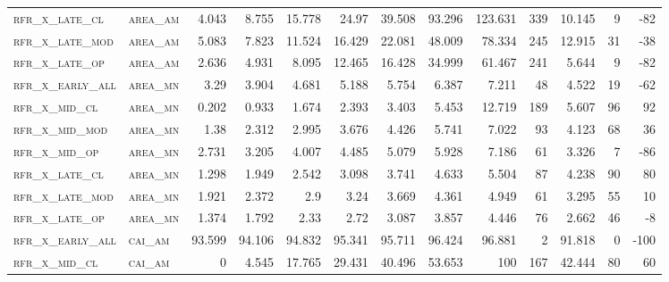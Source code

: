 \begin{landscape}
\begin{center}
\begin{footnotesize}
\begin{longtable}{llrrrrrrrr|rrr}
\textsc{rfr\_x\_late\_cl  } & \textsc{area\_am  }   & 4.043   & 8.755   & 15.778  & 24.97    & 39.508   & 93.296   & 123.631  & 339    & 10.145        & 9             & -82             \\
\textsc{rfr\_x\_late\_mod } & \textsc{area\_am  }   & 5.083   & 7.823   & 11.524  & 16.429   & 22.081   & 48.009   & 78.334   & 245    & 12.915        & 31            & -38             \\
\textsc{rfr\_x\_late\_op  } & \textsc{area\_am  }   & 2.636   & 4.931   & 8.095   & 12.465   & 16.428   & 34.999   & 61.467   & 241    & 5.644         & 9             & -82             \\
\textsc{rfr\_x\_early\_all} & \textsc{area\_mn  }   & 3.29    & 3.904   & 4.681   & 5.188    & 5.754    & 6.387    & 7.211    & 48     & 4.522         & 19            & -62             \\
\textsc{rfr\_x\_mid\_cl   } & \textsc{area\_mn  }   & 0.202   & 0.933   & 1.674   & 2.393    & 3.403    & 5.453    & 12.719   & 189    & 5.607         & 96            & 92              \\
\textsc{rfr\_x\_mid\_mod  } & \textsc{area\_mn  }   & 1.38    & 2.312   & 2.995   & 3.676    & 4.426    & 5.741    & 7.022    & 93     & 4.123         & 68            & 36              \\
\textsc{rfr\_x\_mid\_op   } & \textsc{area\_mn  }   & 2.731   & 3.205   & 4.007   & 4.485    & 5.079    & 5.928    & 7.186    & 61     & 3.326         & 7             & -86             \\
\textsc{rfr\_x\_late\_cl  } & \textsc{area\_mn  }   & 1.298   & 1.949   & 2.542   & 3.098    & 3.741    & 4.633    & 5.504    & 87     & 4.238         & 90            & 80              \\
\textsc{rfr\_x\_late\_mod } & \textsc{area\_mn  }   & 1.921   & 2.372   & 2.9     & 3.24     & 3.669    & 4.361    & 4.949    & 61     & 3.295         & 55            & 10              \\
\textsc{rfr\_x\_late\_op  } & \textsc{area\_mn  }   & 1.374   & 1.792   & 2.33    & 2.72     & 3.087    & 3.857    & 4.446    & 76     & 2.662         & 46            & -8              \\
\textsc{rfr\_x\_early\_all} & \textsc{cai\_am   }   & 93.599  & 94.106  & 94.832  & 95.341   & 95.711   & 96.424   & 96.881   & 2      & 91.818        & 0             & -100            \\
\textsc{rfr\_x\_mid\_cl   } & \textsc{cai\_am   }   & 0       & 4.545   & 17.765  & 29.431   & 40.496   & 53.653   & 100      & 167    & 42.444        & 80            & 60              \\

\end{longtable}
\end{footnotesize}
\end{center}
\end{landscape}
